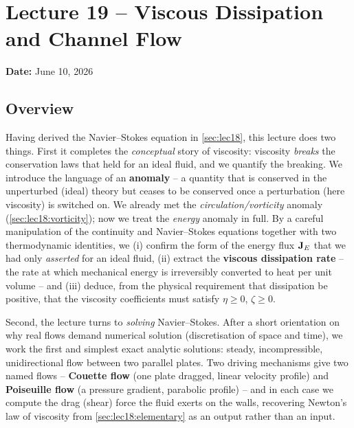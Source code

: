 \documentclass[../main.tex]{subfiles}
\begin{document}
\section{Lecture 19 -- Viscous Dissipation and Channel Flow}\label{sec:lec19}
\begin{center}
  \textbf{Date:} June 10, 2026
\end{center}

\subsection*{Overview}
Having derived the Navier--Stokes equation in \cref{sec:lec18}, this lecture does two things. First it completes the \emph{conceptual} story of viscosity: viscosity \emph{breaks} the conservation laws that held for an ideal fluid, and we quantify the breaking. We introduce the language of an \textbf{anomaly} -- a quantity that is conserved in the unperturbed (ideal) theory but ceases to be conserved once a perturbation (here viscosity) is switched on. We already met the \emph{circulation/vorticity} anomaly (\cref{sec:lec18:vorticity}); now we treat the \emph{energy} anomaly in full. By a careful manipulation of the continuity and Navier--Stokes equations together with two thermodynamic identities, we (i) confirm the form of the energy flux $\mathbf{J}_E$ that we had only \emph{asserted} for an ideal fluid, (ii) extract the \textbf{viscous dissipation rate} -- the rate at which mechanical energy is irreversibly converted to heat per unit volume -- and (iii) deduce, from the physical requirement that dissipation be positive, that the viscosity coefficients must satisfy $\eta\ge 0$, $\zeta\ge 0$.

Second, the lecture turns to \emph{solving} Navier--Stokes. After a short orientation on why real flows demand numerical solution (discretisation of space and time), we work the first and simplest exact analytic solutions: steady, incompressible, unidirectional flow between two parallel plates. Two driving mechanisms give two named flows -- \textbf{Couette flow} (one plate dragged, linear velocity profile) and \textbf{Poiseuille flow} (a pressure gradient, parabolic profile) -- and in each case we compute the drag (shear) force the fluid exerts on the walls, recovering Newton's law of viscosity from \cref{sec:lec18:elementary} as an output rather than an input.
\end{document}
